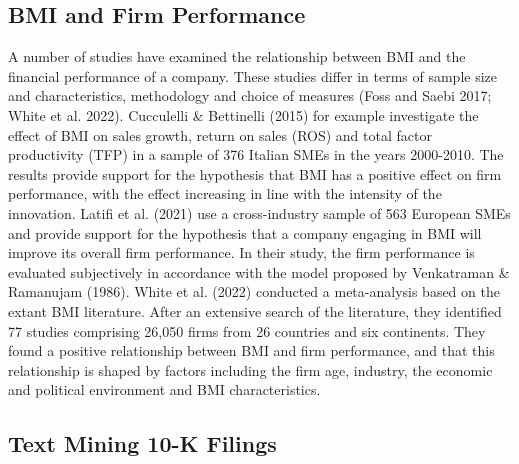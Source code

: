 \documentclass[
]{article}
\begin{document}
\subsection{BMI and Firm Performance}\label{bmi-and-firm-performance}

A number of studies have examined the relationship between BMI and the
financial performance of a company. These studies differ in terms of
sample size and characteristics, methodology and choice of measures
(Foss and Saebi 2017; White et al. 2022). Cucculelli \& Bettinelli
(2015) for example investigate the effect of BMI on sales growth, return
on sales (ROS) and total factor productivity (TFP) in a sample of 376
Italian SMEs in the years 2000-2010. The results provide support for the
hypothesis that BMI has a positive effect on firm performance, with the
effect increasing in line with the intensity of the innovation. Latifi
et al. (2021) use a cross-industry sample of 563 European SMEs and
provide support for the hypothesis that a company engaging in BMI will
improve its overall firm performance. In their study, the firm
performance is evaluated subjectively in accordance with the model
proposed by Venkatraman \& Ramanujam (1986). White et al. (2022)
conducted a meta-analysis based on the extant BMI literature. After an
extensive search of the literature, they identified 77 studies
comprising 26,050 firms from 26 countries and six continents. They found
a positive relationship between BMI and firm performance, and that this
relationship is shaped by factors including the firm age, industry, the
economic and political environment and BMI characteristics.

\subsection{Text Mining 10-K Filings}\label{text-mining-10-k-filings}
\end{document}
